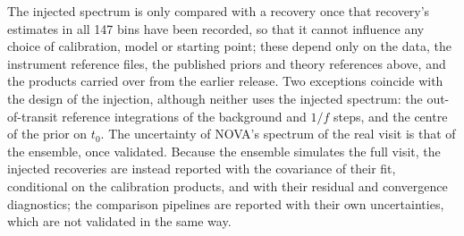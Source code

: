 The injected spectrum is only compared with a recovery once that recovery's
estimates in all 147 bins have been recorded, so that it cannot influence any
choice of calibration, model or starting point; these depend only on the
data, the instrument reference files, the published priors and theory
references above, and the products carried over from the earlier release. Two
exceptions coincide with the design of the injection, although neither uses
the injected spectrum: the out-of-transit reference integrations of the
background and $1/f$ steps, and the centre of the prior on $t_0$. The uncertainty of NOVA's spectrum of the real visit is that of the
ensemble, once validated. Because the ensemble simulates the full visit, the
injected recoveries are instead reported with the covariance of their fit,
conditional on the calibration products, and with their residual and
convergence diagnostics; the comparison pipelines are reported with their own
uncertainties, which are not validated in the same way.
